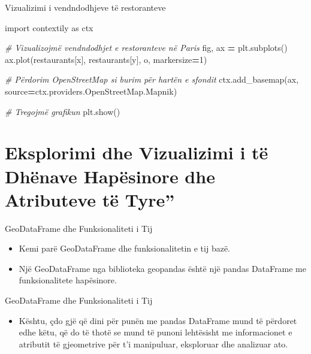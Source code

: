 \documentclass[
  ignorenonframetext,
]{beamer}
\newenvironment{Shaded}{\begin{snugshade}}{\end{snugshade}}
\newcommand{\CommentTok}[1]{\textcolor[rgb]{0.56,0.35,0.01}{\textit{#1}}}
\newcommand{\DecValTok}[1]{\textcolor[rgb]{0.00,0.00,0.81}{#1}}
\newcommand{\ImportTok}[1]{#1}
\newcommand{\NormalTok}[1]{#1}
\newcommand{\OperatorTok}[1]{\textcolor[rgb]{0.81,0.36,0.00}{\textbf{#1}}}
\newcommand{\StringTok}[1]{\textcolor[rgb]{0.31,0.60,0.02}{#1}}
\providecommand{\tightlist}{%
  \setlength{\itemsep}{0pt}\setlength{\parskip}{0pt}}
\begin{document}
\begin{frame}[fragile]{Vizualizimi i vendndodhjeve të restoranteve}
\protect\hypertarget{vizualizimi-i-vendndodhjeve-tuxeb-restoranteve-1}{}

\begin{Shaded}
\begin{Highlighting}[]
\ImportTok{import}\NormalTok{ contextily }\ImportTok{as}\NormalTok{ ctx}

\CommentTok{\# Vizualizojmë vendndodhjet e restoranteve në Paris}
\NormalTok{fig, ax }\OperatorTok{=}\NormalTok{ plt.subplots()}
\NormalTok{ax.plot(restaurants[}\StringTok{\textquotesingle{}x\textquotesingle{}}\NormalTok{], restaurants[}\StringTok{\textquotesingle{}y\textquotesingle{}}\NormalTok{], }\StringTok{\textquotesingle{}o\textquotesingle{}}\NormalTok{, markersize}\OperatorTok{=}\DecValTok{1}\NormalTok{)}

\CommentTok{\# Përdorim OpenStreetMap si burim për hartën e sfondit}
\NormalTok{ctx.add\_basemap(ax, source}\OperatorTok{=}\NormalTok{ctx.providers.OpenStreetMap.Mapnik)}

\CommentTok{\# Tregojmë grafikun}
\NormalTok{plt.show()}
\end{Highlighting}
\end{Shaded}
\end{frame}

\hypertarget{eksplorimi-dhe-vizualizimi-i-tuxeb-dhuxebnave-hapuxebsinore-dhe-atributeve-tuxeb-tyre}{%
\section{Eksplorimi dhe Vizualizimi i të Dhënave Hapësinore dhe
Atributeve të
Tyre''}\label{eksplorimi-dhe-vizualizimi-i-tuxeb-dhuxebnave-hapuxebsinore-dhe-atributeve-tuxeb-tyre}}

\begin{frame}{GeoDataFrame dhe Funksionaliteti i Tij}
\protect\hypertarget{geodataframe-dhe-funksionaliteti-i-tij}{}
\begin{itemize}
\item
  Kemi parë GeoDataFrame dhe funksionalitetin e tij bazë.
\item
  Një GeoDataFrame nga biblioteka geopandas është një pandas DataFrame
  me funksionalitete hapësinore.
\end{itemize}
\end{frame}

\begin{frame}{GeoDataFrame dhe Funksionaliteti i Tij}
\protect\hypertarget{geodataframe-dhe-funksionaliteti-i-tij-1}{}
\begin{itemize}
\tightlist
\item
  Kështu, çdo gjë që dini për punën me pandas DataFrame mund të përdoret
  edhe këtu, që do të thotë se mund të punoni lehtësisht me
  informacionet e atributit të gjeometrive për t'i manipuluar,
  eksploruar dhe analizuar ato.
\end{itemize}
\end{frame}
\end{document}
